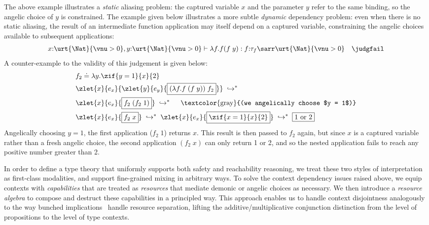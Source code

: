 The above example illustrates a \emph{static} aliasing problem: the
captured variable $x$ and the parameter $y$ refer to the same
binding, so the angelic choice of $y$ is constrained.  The example
given below illustrates a more subtle \emph{dynamic} dependency problem:
even when there is no static aliasing, the result of an intermediate
function application may itself depend on a captured variable,
constraining the angelic choices available to subsequent applications:
\begin{align*}
    x{:}\urt{\Nat}{\vnu > 0}, y{:}\urt{\Nat}{\vnu > 0} \vdash \lambda f. f(f\;y) : f{:}\tau_f \sarr \urt{\Nat}{\vnu > 0} \quad \judgfail
\end{align*}\noindent
A counter-example to the validity of this judgement is given below:
\begin{align*}
    &f_2 \doteq \lambda y.\zif{y = 1}{x}{2} \quad
    \\& \zlet{x}{e_x}{\zlet{y}{e_y}{\boxed{(\lambda f. f\;(f\;y))\;f_2}}} \;\hookrightarrow^*\;
    \\& \zlet{x}{e_x}{\boxed{f_2\;(f_2\;1)}} \;\hookrightarrow^*\;  \quad \text{\textcolor{gray}{(we angelically choose $y = 1$)}}  
    \\& \zlet{x}{e_x}{\boxed{f_2\;x}} \;\hookrightarrow^*\; \zlet{x}{e_x}{\boxed{\zif{x = 1}{x}{2}}} \;\hookrightarrow^*\; \boxed{1 \text{ or } 2}
\end{align*}\noindent
Angelically choosing $y = 1$, the first application ($f_2\; 1$)
returns $x$. This result is then passed to $f_2$
again, but since $x$
is a captured variable rather than a fresh angelic choice,
the second application $(f_2\; x)$
can only return 1 or 2, and so the nested application
fails to reach any positive number greater than 2.

In order to define a type theory that uniformly supports both safety
and reachability reasoning, we treat these two styles of
interpretation as first-class modalities, and support fine-grained
mixing in arbitrary ways.  To solve the context dependency issues
raised above, we equip contexts with \emph{capabilities} that are
treated as \emph{resources} that mediate demonic or angelic choices as
necessary. We then introduce a \emph{resource algebra} to compose and
destruct these capabilities in a principled way.  This approach
enables us to handle context disjointness analogously to the way
bunched implications~\cite{...} handle resource separation, lifting
the additive/multiplicative conjunction distinction from the level of
propositions to the level of type contexts.

